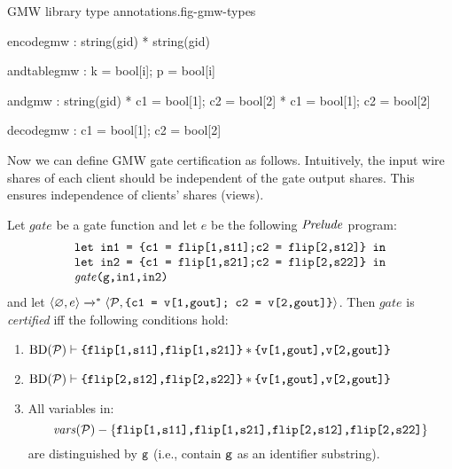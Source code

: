 \begin{fpfig}[t]{GMW library type annotations.}{fig-gmw-types}
{\footnotesize
  \begin{verbatimtab}
   encodegmw   : string(gid) * string(gid)
    
   andtablegmw : { k = bool[i]; p = bool[i] }
    
   andgmw      : string(gid) *  { c1 = bool[1]; c2 = bool[2] } * { c1 = bool[1]; c2 = bool[2] }
    
   decodegmw   : { c1 = bool[1]; c2 = bool[2] }  \end{verbatimtab}
}
\end{fpfig}

Now we can define GMW gate certification as follows. Intuitively, the
input wire shares of each client should be independent of the gate output
shares. This ensures independence of clients' shares (views).
\begin{definition}
  \label{definition-gmwgate-certification}
  Let $\mathit{gate}$ be a gate function and let $e$ be the following
  $\mathit{Prelude}$ program:
  $$
  \begin{array}{l}
    \texttt{let in1 = \{c1 = flip[1,s11];c2 = flip[2,s12]\} in}\\
    \texttt{let in2 = \{c1 = flip[1,s21];c2 = flip[2,s22]\} in}\\
    \mathit{gate}\texttt{(g,in1,in2)}
  \end{array}
  $$
  and let $
  \langle \varnothing,e \rangle\xrightarrow{}^{*}\langle \mathcal{P},\texttt{\{c1 = v[1,gout]; c2 = v[2,gout]\}} \rangle
  $.
  Then $\mathit{gate}$ is \emph{certified} iff the following conditions hold:
  \begin{enumerate}[\hspace{5mm}i.]
  \item $\mathrm{BD}(\mathcal{P}) \vdash \texttt{\{flip[1,s11],flip[1,s21]\}} * \texttt{\{v[1,gout],v[2,gout]\}}$
  \item $\mathrm{BD}(\mathcal{P}) \vdash \texttt{\{flip[2,s12],flip[2,s22]\}} * \texttt{\{v[1,gout],v[2,gout]\}}$
  \item All variables in:$$\mathit{vars}(\mathcal{P}) - \{ \texttt{flip[1,s11],flip[1,s21],flip[2,s12],flip[2,s22]}\}$$
    are distinguished by $\texttt{g}$ (i.e., contain $\texttt{g}$ as an identifier substring). 
  \end{enumerate}
\end{definition}

